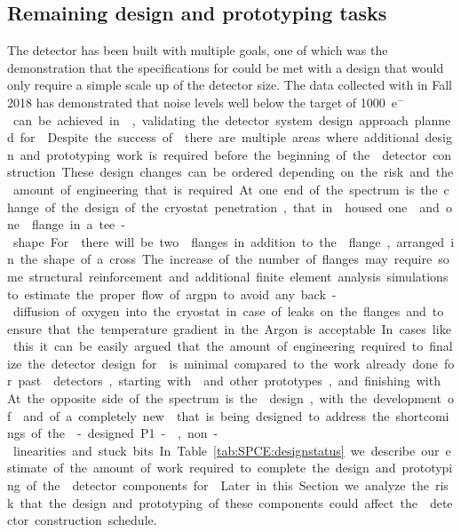 \subsection{Remaining design and prototyping tasks}
\label{sec:fdsp-tpcelec-overview-remaining}

The  detector has been built with multiple
goals, one of which was the demonstration that the specifications
for  could be met with a design that would only require a simple
scale up of the detector size. The data collected with 
in Fall 2018 has demonstrated that noise levels well below the target
of \SI{1000}{e$^-$} can be achieved in \lar, validating the
detector system design approach planned for .

Despite the success of  there are multiple areas where
additional design and prototyping work is required before the
beginning of the  detector construction. These design changes
can be ordered depending on the risk and the amount of engineering
that is required. At one end of the spectrum is the change of the
design of the cryostat penetration, that in  housed one
 and one  flange in a tee-shape. For 
there will be two  flanges in addition to the 
flange, arranged in the shape of a cross. The increase of the number
of flanges may require some structural reinforcement and additional
finite element analysis simulations to estimate the proper flow of
argpn to avoid any back-diffusion of oxygen into the cryostat in case
of leaks on the flanges and to ensure that the temperature gradient
in the Argon is acceptable. In cases like this it can be easily
argued that the amount of engineering required to finalize the
detector design for  is minimal compared to the work already
done for past  detectors, starting with  and
other prototypes, and finishing with . At the opposite
side of the spectrum is the  design, with the
development of  and of a completely new 
that is being designed to address the shortcomings of the -designed
P1-, non-linearities and stuck bits. In Table~\ref{tab:SPCE:designstatus}
we describe our estimate of the amount of work required to complete
the design and prototyping of the  detector components for
. Later in this Section we analyze the risk that the design
and prototyping of these components could affect the  detector
construction schedule.

